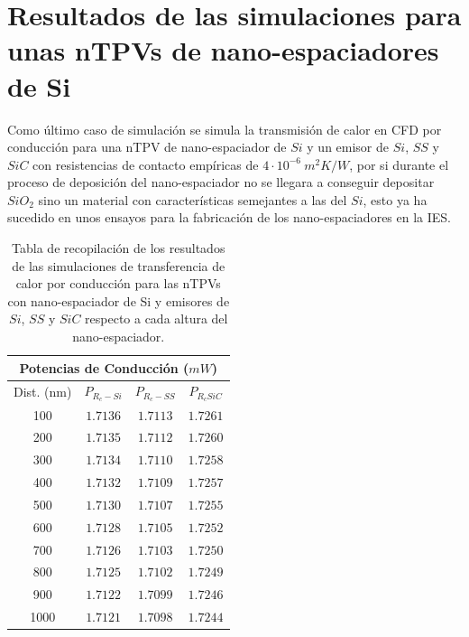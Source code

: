 \section{Resultados de las simulaciones para unas nTPVs de nano-espaciadores de Si}\label{sec:res_XxSiGe}
\graphicspath{ {./figuras/Resultados/DiffMatEsp} }
Como último caso de simulación se simula la transmisión de calor en CFD por conducción para una nTPV de nano-espaciador de $Si$ y un emisor de $Si$, $SS$ y $SiC$ con resistencias de contacto empíricas de $4\cdot 10^{-6} \ m^2 K/W$, por si durante el proceso de deposición del nano-espaciador no se llegara a conseguir depositar $SiO_2$ sino un material con características semejantes a las del $Si$, esto ya ha sucedido en unos ensayos para la fabricación de los nano-espaciadores en la IES. 
\begin{table}[H]
	\centering
	\caption{Tabla de recopilación de los resultados de las simulaciones de transferencia de calor por conducción para las nTPVs con nano-espaciador de Si y emisores de $Si$, $SS$ y $SiC$ respecto a cada altura del nano-espaciador.}
		\begin{tabular}{|c||c|c|c|}
		\hline
		 \multicolumn{4}{|c|}{\textbf{Potencias de Conducción ($mW$)}}\\	\hline
		Dist. (nm)&$P_{R_c-Si}$&$P_{R_c-SS}$&$P_{R_cSiC}$\\ \hline \hline 
		100&$1.7136$&$1.7113$&$1.7261$\\ \hline 
		200&$1.7135$&$1.7112$&$1.7260$\\ \hline 
		300&$1.7134$&$1.7110$&$1.7258$\\ \hline 
		400&$1.7132$&$1.7109$&$1.7257$\\ \hline 
		500&$1.7130$&$1.7107$&$1.7255$\\ \hline 
		600&$1.7128$&$1.7105$&$1.7252$\\ \hline 
		700&$1.7126$&$1.7103$&$1.7250$\\ \hline 
		800&$1.7125$&$1.7102$&$1.7249$\\ \hline 
		900&$1.7122$&$1.7099$&$1.7246$\\ \hline 
		1000&$1.7121$&$1.7098$&$1.7244$\\ \hline
		\end{tabular}
	\label{tab:nanoEspaciadorDeSi}
\end{table}
